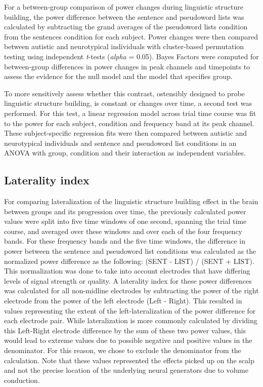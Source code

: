 For a between-group comparison of power changes during linguistic structure building, the power difference between the sentence and pseudoword lists was calculated by subtracting the grand averages of the pseudoword lists condition from the sentences condition for each subject. Power changes were then compared between autistic and neurotypical individuals with cluster-based permutation testing using independent \textit{t}-tests (\textit{alpha} = 0.05). Bayes Factors were computed for between-group differences in power changes in peak channels and timepoints to assess the evidence for the null model and the model that specifies group.

To more sensitively assess whether this contrast, ostensibly designed to probe linguistic structure building, is constant or changes over time, a second test was performed.  For this test, a linear regression model across trial time course was fit to the power for each subject, condition and frequency band at its peak channel. These subject-specific regression fits were then compared between autistic and neurotypical individuals and sentence and pseudoword list conditions in an ANOVA with group, condition and their interaction as independent variables. 

\subsection*{Laterality index}

For comparing lateralization of the linguistic structure building effect in the brain between groups and its progression over time, the previously calculated power values were split into five time windows of one second, spanning the trial time course, and averaged over these windows and over each of the four frequency bands. For these frequency bands and the five time windows, the difference in power between the sentence and pseudoword list conditions was calculated as the normalized power difference as the following: (SENT - LIST) / (SENT + LIST). This normalization was done to take into account electrodes that have differing levels of signal strength or quality. A laterality index for these power differences was calculated for all non-midline electrodes by subtracting the power of the right electrode from the power of the left electrode (Left - Right). This resulted in values representing the extent of the left-lateralization of the power difference for each electrode pair. While lateralization is more commonly calculated by dividing this Left-Right electrode difference by the sum of these two power values, this would lead to extreme values due to possible negative and positive values in the denominator. For this reason, we chose to exclude the denominator from the calculation. Note that these values represented the effects picked up on the scalp and not the precise location of the underlying neural generators due to volume conduction.

